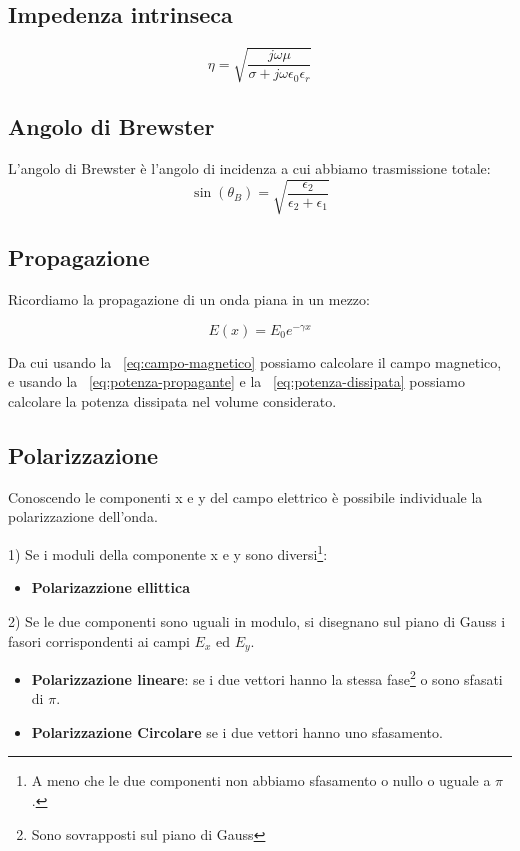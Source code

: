 \documentclass[10pt,a4paper]{report}
\begin{document}
	\subsection{Impedenza intrinseca}
		\begin{equation}
		\eta=\sqrt{\frac{j\omega\mu}{\sigma+j\omega\epsilon_0\epsilon_r}}
		\end{equation}
		

	\subsection{Angolo di Brewster}

	L'angolo di Brewster è l'angolo di incidenza a cui abbiamo trasmissione totale:
	\begin{equation}
	\sin(\theta_B)=\sqrt{\frac{\epsilon_2}{\epsilon_2+\epsilon_1}}
	\label{eq:brewster}
	\end{equation}




	\subsection{Propagazione}
	Ricordiamo la propagazione di un onda piana in un mezzo:
	

	\begin{equation}
	E(x)=E_0e^{-\gamma x}
	\end{equation}
	
	Da cui usando la ~\ref{eq:campo-magnetico} possiamo calcolare il campo magnetico, e usando la ~\ref{eq:potenza-propagante} e la ~\ref{eq:potenza-dissipata} possiamo calcolare la potenza dissipata nel volume considerato.


	\subsection{Polarizzazione}

	Conoscendo le componenti x e y del campo elettrico è possibile individuale la polarizzazione dell'onda.

	\raggedright	{1) Se i moduli della componente x e y sono diversi\footnote{A meno che le due componenti non abbiamo sfasamento o nullo o uguale a $\pi$.}:}

	\begin{itemize} 
	\item \textbf{Polarizazzione ellittica}
	\end{itemize}
	\raggedright{	2) Se le due componenti sono uguali in modulo, si disegnano sul piano di Gauss i fasori corrispondenti ai campi $E_x$ ed $E_y$.}
	\begin{itemize}
	\item \textbf{Polarizzazione lineare}: se i due vettori hanno la stessa fase\footnote{Sono sovrapposti sul piano di Gauss} o sono sfasati di $\pi$.
	\item \textbf{Polarizzazione Circolare} se i due vettori hanno uno sfasamento.
	\end{itemize}
		
\end{document}
